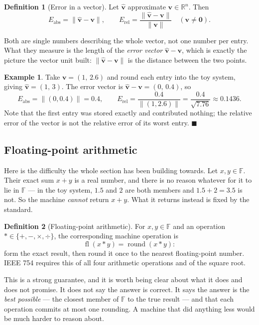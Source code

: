 \documentclass[11pt]{article}
\theoremstyle{plain}
\theoremstyle{definition}
\newtheorem{defn}{Definition}[section]
\newtheorem{ex}{Example}[section]
\theoremstyle{remark}
\newcommand{\R}{\mathbb{R}}
\newcommand{\F}{\mathbb{F}}
\newcommand{\vc}[1]{\mathbf{#1}}
\newcommand{\norm}[1]{\lVert #1\rVert}
\begin{document}
\begin{defn}[Error in a vector]
Let $\hat{\vc{v}}$ approximate $\vc{v}\in\R^{n}$. Then
\[
  E_{\text{abs}} = \norm{\hat{\vc{v}}-\vc{v}},
  \qquad
  E_{\text{rel}} = \frac{\norm{\hat{\vc{v}}-\vc{v}}}{\norm{\vc{v}}}
  \quad (\vc{v}\neq\vc{0}) .
\]
\end{defn}

\noindent Both are single numbers describing the whole vector, not one number
per entry. What they measure is the length of the \emph{error vector}
$\hat{\vc{v}}-\vc{v}$, which is exactly the picture the vector unit built:
$\norm{\hat{\vc{v}}-\vc{v}}$ is the distance between the two points.

\begin{ex}
Take $\vc{v}=(1,\,2.6)$ and round each entry into the toy system, giving
$\hat{\vc{v}}=(1,\,3)$. The error vector is $\hat{\vc{v}}-\vc{v}=(0,\,0.4)$, so
\[
  E_{\text{abs}} = \norm{(0,0.4)} = 0.4,
  \qquad
  E_{\text{rel}} = \frac{0.4}{\norm{(1,2.6)}}
                 = \frac{0.4}{\sqrt{7.76}} \approx 0.1436 .
\]
Note that the first entry was stored exactly and contributed nothing; the
relative error of the vector is not the relative error of its worst entry.
\hfill$\blacksquare$
\end{ex}

\subsection{Floating-point arithmetic}
Here is the difficulty the whole section has been building towards. Let
$x,y\in\F$. Their exact sum $x+y$ is a real number, and there is no reason
whatever for it to lie in $\F$ --- in the toy system, $1.5$ and $2$ are both
members and $1.5+2=3.5$ is not. So the machine \emph{cannot} return $x+y$. What
it returns instead is fixed by the standard.

\begin{defn}[Floating-point arithmetic]
For $x,y\in\F$ and an operation $\ast\in\{+,-,\times,\div\}$, the corresponding
machine operation is
\[
  \operatorname{fl}(x\ast y) = \operatorname{round}(x\ast y) :
\]
form the exact result, then round it once to the nearest floating-point number.
IEEE 754 requires this of all four arithmetic operations and of the square root.
\end{defn}

\noindent This is a strong guarantee, and it is worth being clear about what it
does and does not promise. It does not say the answer is correct. It says the
answer is the \emph{best possible} --- the closest member of $\F$ to the true
result --- and that each operation commits at most one rounding. A machine that
did anything less would be much harder to reason about.
\end{document}
